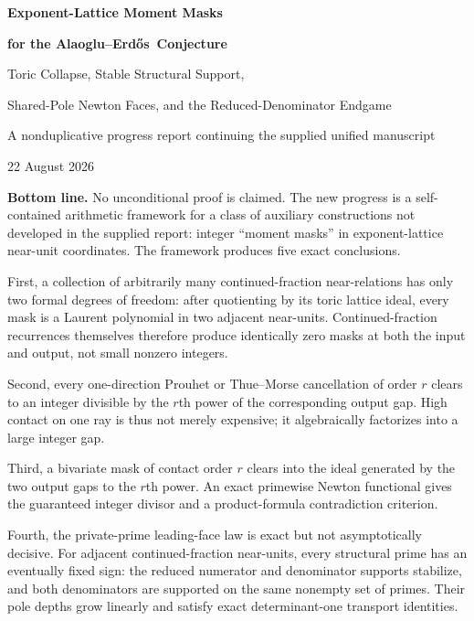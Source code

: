 \documentclass[11pt,oneside]{article}
\theoremstyle{definition}
\theoremstyle{remark}
\newcommand{\AEname}{Alaoglu--Erd\H{o}s}
\begin{document}

\begin{titlepage}
\centering
\vspace*{0.7cm}
{\Huge\bfseries Exponent-Lattice Moment Masks\par}
\vspace{0.2cm}
{\Huge\bfseries for the \AEname\ Conjecture\par}
\vspace{0.65cm}
{\LARGE Toric Collapse, Stable Structural Support,\par}
\vspace{0.1cm}
{\LARGE Shared-Pole Newton Faces, and the Reduced-Denominator Endgame\par}
\vspace{1.0cm}
{\large A nonduplicative progress report continuing the supplied unified manuscript\par}
\vspace{0.35cm}
{\large 22 August 2026\par}
\vfill
\begin{minipage}{0.91\textwidth}
\small
\textbf{Bottom line.}
No unconditional proof is claimed.  The new progress is a self-contained arithmetic framework
for a class of auxiliary constructions not developed in the supplied report: integer
``moment masks'' in exponent-lattice near-unit coordinates.  The framework produces five
exact conclusions.

First, a collection of arbitrarily many continued-fraction near-relations has only two
formal degrees of freedom: after quotienting by its toric lattice ideal, every mask is a
Laurent polynomial in two adjacent near-units.  Continued-fraction recurrences themselves
therefore produce identically zero masks at both the input and output, not small nonzero
integers.

Second, every one-direction Prouhet or Thue--Morse cancellation of order $r$ clears to an
integer divisible by the $r$th power of the corresponding output gap.  High contact on one
ray is thus not merely expensive; it algebraically factorizes into a large integer gap.

Third, a bivariate mask of contact order $r$ clears into the ideal generated by the two
output gaps to the $r$th power.  An exact primewise Newton functional gives the guaranteed
integer divisor and a product-formula contradiction criterion.

Fourth, the private-prime leading-face law is exact but not asymptotically decisive.
For adjacent continued-fraction near-units, every structural prime has an eventually fixed
sign: the reduced numerator and denominator supports stabilize, and both denominators are
supported on the same nonempty set of primes.  Their pole depths grow linearly and satisfy
exact determinant-one transport identities.


\end{minipage}
\end{titlepage}
\end{document}
